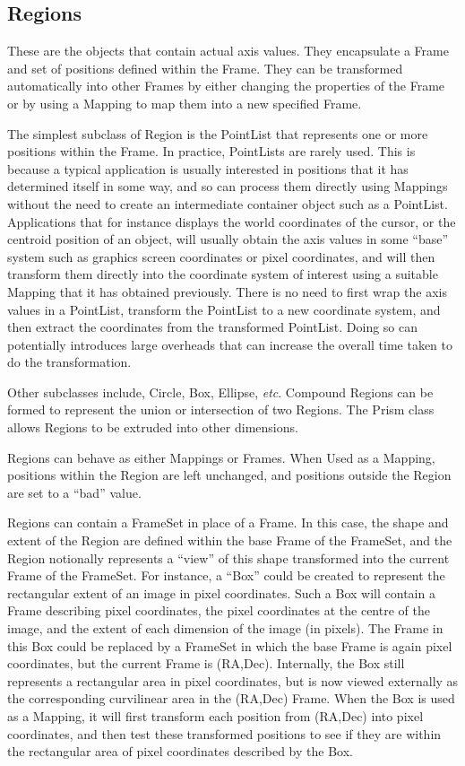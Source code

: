 \documentclass[final,authoryear,5p,times,twocolumn]{elsarticle}
\begin{document}
\subsection{Regions}

These are the objects that contain actual axis values. They
encapsulate a Frame and set of positions defined within the
Frame. They can be transformed automatically into other Frames by
either changing the properties of the Frame or by using a Mapping to
map them into a new specified Frame.

The simplest subclass of Region is the PointList that represents one
or more positions within the Frame.  In practice, PointLists are
rarely used. This is because a typical application is usually
interested in positions that it has determined itself in some way, and
so can process them directly using Mappings without the need to create
an intermediate container object such as a PointList. Applications
that for instance displays the world coordinates of the cursor, or the
centroid position of an object, will usually obtain the axis values in
some ``base'' system such as graphics screen coordinates or pixel
coordinates, and will then transform them directly into the coordinate
system of interest using a suitable Mapping that it has obtained
previously. There is no need to first wrap the axis values in a
PointList, transform the PointList to a new coordinate system, and
then extract the coordinates from the transformed PointList. Doing so
can potentially introduces large overheads that can increase the
overall time taken to do the transformation.

Other subclasses include, Circle, Box, Ellipse, \emph{etc}. Compound Regions
can be formed to represent the union or intersection of two
Regions. The Prism class allows Regions to be extruded into other
dimensions.

Regions can behave as either Mappings or Frames. When Used as a
Mapping, positions within the Region are left unchanged, and positions
outside the Region are set to a ``bad'' value.

Regions can contain a FrameSet in place of a Frame. In this case, the
shape and extent of the Region are defined within the base Frame of
the FrameSet, and the Region notionally represents a ``view'' of this
shape transformed into the current Frame of the FrameSet. For
instance, a ``Box'' could be created to represent the rectangular extent
of an image in pixel coordinates. Such a Box will contain a Frame
describing pixel coordinates, the pixel coordinates at the centre of
the image, and the extent of each dimension of the image (in
pixels). The Frame in this Box could be replaced by a FrameSet in
which the base Frame is again pixel coordinates, but the current Frame
is (RA,Dec). Internally, the Box still represents a rectangular area
in pixel coordinates, but is now viewed externally as the
corresponding curvilinear area in the (RA,Dec) Frame. When the Box is
used as a Mapping, it will first transform each position from (RA,Dec)
into pixel coordinates, and then test these transformed positions to
see if they are within the rectangular area of pixel coordinates
described by the Box.
\end{document}
